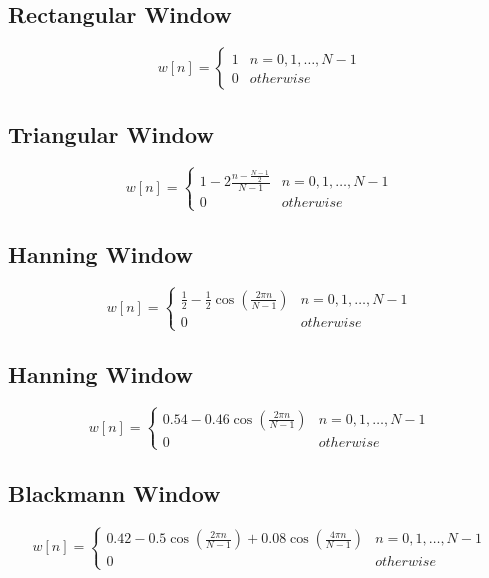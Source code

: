 \documentclass{article}
\begin{document}
\subsection{Rectangular Window}
\begin{equation}
  w[n] = \begin{cases}  1 & n=0,1,\dots, N-1  \\ 0 & otherwise \end{cases}
\end{equation}

\subsection{Triangular Window}
\begin{equation}
  w[n] = \begin{cases}  1-2 \frac{n-\frac{N-1}{2}}{N-1} & n=0,1,\dots, N-1  \\ 0 & otherwise \end{cases}
\end{equation}

\subsection{Hanning Window}
\begin{equation}
  w[n] = \begin{cases}  \frac{1}{2}-\frac{1}{2} \cos(\frac{2\pi n}{N-1}) & n=0,1,\dots, N-1  \\ 0 & otherwise \end{cases}
\end{equation}

\subsection{Hanning Window}
\begin{equation}
  w[n] = \begin{cases}  0.54-0.46 \cos(\frac{2\pi n}{N-1}) & n=0,1,\dots, N-1  \\ 0 & otherwise \end{cases}
\end{equation}

\subsection{Blackmann Window}
\begin{equation}
  w[n] = \begin{cases}  0.42-0.5 \cos(\frac{2\pi n}{N-1}) + 0.08 \cos(\frac{4\pi n}{N-1}) & n=0,1,\dots, N-1  \\ 0 & otherwise \end{cases}
\end{equation}
\end{document}
